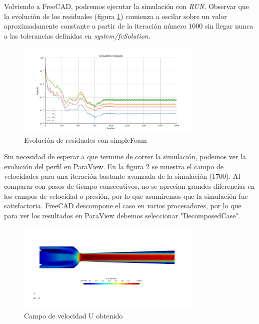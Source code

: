 \documentclass[oneside,a4paper,spanish,links]{amca}
\begin{document}
Volviendo a FreeCAD, podremos ejecutar la simulación con \textit{RUN}. Observar que la evolución de los residuales (figura \ref{fg:03_sf_residuales}) comienza a oscilar sobre un valor aproximadamente constante a partir de la iteración número 1000 sin llegar nunca a las tolerancias definidas en \textit{system/fvSolution}. 

\begin{figure}[htb]
	\centerline{
		\includegraphics[width=0.8\textwidth]{Figuras/03_SF_RESIDUALES.png}}
	\caption{Evolución de residuales con simpleFoam} \label{fg:03_sf_residuales}
\end{figure}

Sin necesidad de esperar a que termine de correr la simulación, podemos ver la evolución del perfil en ParaView. En la figura \ref{fg:03_sf_U} se muestra el campo de velocidades para una iteración bastante avanzada de la simulación (1700). Al comparar con pasos de tiempo consecutivos, no se aprecian grandes diferencias en los campos de velocidad o presión, por lo que asumiremos que la simulación fue satisfactoria.
FreeCAD descompone el caso en varios procesadores, por lo que para ver los resultados en ParaView debemos seleccionar "DecomposedCase".

\begin{figure}[htb]
	\centerline{
		\includegraphics[width=0.8\textwidth]{Figuras/03_SF_U.png}}
	\caption{Campo de velocidad U obtenido} \label{fg:03_sf_U}
\end{figure}
\end{document}
